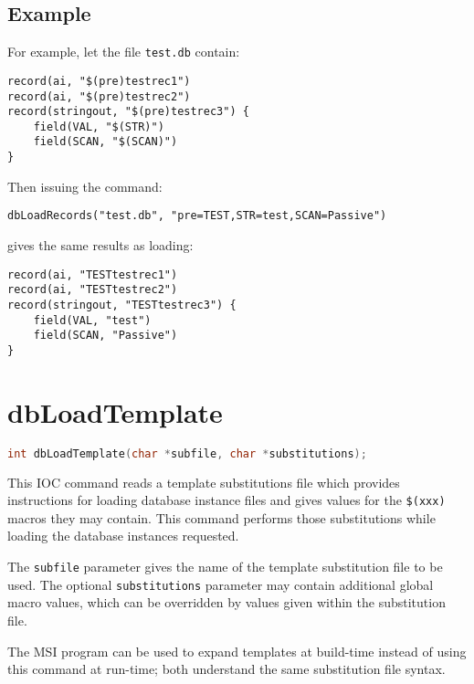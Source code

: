 \subsection{Example}

For example, let the file \verb|test.db| contain:

\begin{lstlisting}[language=dbd]
record(ai, "$(pre)testrec1")
record(ai, "$(pre)testrec2")
record(stringout, "$(pre)testrec3") {
    field(VAL, "$(STR)")
    field(SCAN, "$(SCAN)")
}
\end{lstlisting}

Then issuing the command:

\begin{lstlisting}[language=dbd]
dbLoadRecords("test.db", "pre=TEST,STR=test,SCAN=Passive")
\end{lstlisting}

gives the same results as loading:

\begin{lstlisting}[language=dbd]
record(ai, "TESTtestrec1")
record(ai, "TESTtestrec2")
record(stringout, "TESTtestrec3") {
    field(VAL, "test")
    field(SCAN, "Passive")
}
\end{lstlisting}

\section{dbLoadTemplate}

\begin{lstlisting}[language=C]
int dbLoadTemplate(char *subfile, char *substitutions);
\end{lstlisting}

This IOC command reads a template substitutions file which provides instructions for loading database instance files and gives values for the \verb|$(xxx)| macros they may contain.
This command performs those substitutions while loading the database instances requested.

The \verb|subfile| parameter gives the name of the template substitution file to be used.
The optional \verb|substitutions| parameter may contain additional global macro values, which can be overridden by values given within the substitution file.

The MSI program can be used to expand templates at build-time instead of using this command at run-time; both understand the same substitution file syntax.

